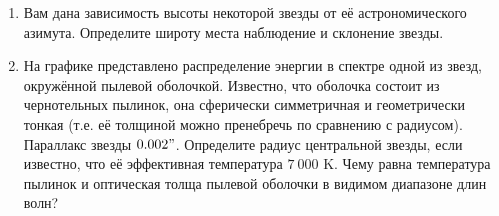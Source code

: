 \documentclass[12pt]{article}
\begin{document}
\begin{enumerate}
    \item Вам дана зависимость высоты некоторой звезды от её астрономического азимута. Определите широту места наблюдение и склонение звезды.
    \begin{figure}[h]
        \centering
    \end{figure}
    \newpage
    \item На графике представлено распределение энергии в спектре одной из звезд,
    окружённой пылевой оболочкой. Известно, что оболочка состоит из чернотельных пылинок, она сферически симметричная и геометрически тонкая (т.е. её толщиной можно пренебречь по сравнению с радиусом). Параллакс звезды $0.002"$. Определите радиус центральной звезды, если известно,
    что её эффективная температура $7~000$ K. Чему равна температура пылинок
    и оптическая толща пылевой оболочки в видимом диапазоне длин волн?
    \begin{figure}[h]
    \end{figure}
    

\end{enumerate}
\end{document}
